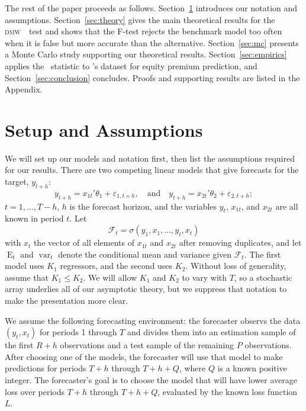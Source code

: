\documentclass[11pt]{article}
\DeclareMathOperator{\E}{E}
\DeclareMathOperator{\var}{var}
\newcommand{\citepos}[1]{\citeauthor{#1}'s \citeyearpar{#1}}
\newcommand{\h}{h}
\newcommand{\dmw}{\textsc{dmw}}
\begin{document}
The rest of the paper proceeds as follows.
Section~\ref{sec:assumptions} introduces our notation and assumptions.
Section~\ref{sec:theory} gives the main theoretical results for the
\dmw\ \oos\ test and shows that the F-test rejects the benchmark model
too often when it is false but more accurate than the
alternative. Section~\ref{sec:mc} presents a Monte Carlo study
supporting our theoretical results.  Section~\ref{sec:empirics}
applies the \oos\ statistic to \citepos{GoW:08} dataset
for equity premium prediction, and Section~\ref{sec:conclusion}
concludes.  Proofs and supporting results are listed in the Appendix.

\section{Setup and Assumptions}\label{sec:assumptions}
We will set up our models and notation first, then list the assumptions
required for our results.  There are two competing linear models that
give forecasts for the target, $y_{t+\h}$:
\[
y_{t+\h} = x_{1t}'\theta_1 + \varepsilon_{1,t+h}, \quad\text{and}\quad
y_{t+\h} = x_{2t}'\theta_2 + \varepsilon_{2,t+h};
\]
$t = 1,\dots,T-h$, $\h$ is the forecast horizon, and the
variables $y_t$, $x_{1t}$, and $x_{2t}$ are all known in period $t$.
Let
\begin{equation*}
  \mathcal{F}_t = \sigma(y_1, x_1, \dots, y_t, x_t)
\end{equation*}
with $x_t$ the vector of all elements of $x_{1t}$ and $x_{2t}$ after
removing duplicates, and let $\E_t$ and $\var_t$ denote the
conditional mean and variance given $\mathcal{F}_t$.  The first model
uses $K_1$ regressors, and the second uses $K_2$.  Without loss of
generality, assume that $K_1 \leq K_2$.  We will allow $K_1$ and $K_2$
to vary with $T$, so a stochastic array underlies all of our
asymptotic theory, but we suppress that notation to make the
presentation more clear.

We assume the following forecasting environment: the forecaster
observs the data $(y_t,x_t)$ for periods 1 through $T$ and divides
them into an estimation sample of the first $R+h$ observations and a
test sample of the remaining $P$ observations.  After choosing one of
the models, the forecaster will use that model to make predictions for
periods $T + h$ through $T + h + Q$, where $Q$ is a known positive
integer.  The forecaster's goal is to choose the model that will have
lower average loss over periods $T+h$ through $T+h+Q$, evaluated by
the known loss function $L$.
\end{document}
